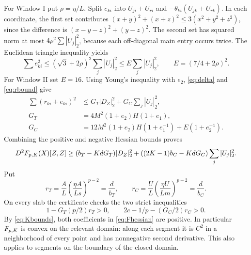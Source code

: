 \documentclass[11pt,a4paper]{article}
\theoremstyle{remark}\newtheorem{remark}[theorem]{Remark}
\begin{document}
For Window I put $\rho=\eta/L$. Split $e_{ki}$ into
$U_{ji}+U_{ri}$ and $-\theta_{ki}(U_{jk}+U_{rk})$.
In each coordinate, the first set contributes $(x+y)^2+(x+z)^2\le
3(x^2+y^2+z^2)$, since the difference is
$(x-y-z)^2+(y-z)^2$. The second set has squared norm at most
$4\rho^2\sum|U_j|_2^2$, because each off-diagonal main entry occurs
twice. The Euclidean triangle inequality yields
\begin{equation}\label{eq:ebound}
\sum e_{ki}^2\le(\sqrt3+2\rho)^2\sum_j|U_j|_2^2
\le E\sum_j|U_j|_2^2,\qquad E=(7/4+2\rho)^2.
\end{equation}
For Window II set $E=16$. Using Young's inequality with $e_2$,
\eqref{eq:delta} and \eqref{eq:rbound} give
\begin{align}
\sum(r_{ki}+e_{ki})^2&\le G_T|D_Z|_2^2+G_C\sum_j|U_j|_2^2,\label{eq:pairbound}\\
G_T&=4M^2(1+e_2)H(1+e_1),\nonumber\\
G_C&=12M^2(1+e_2)H(1+e_1^{-1})+E(1+e_2^{-1}).\nonumber
\end{align}
Combining the positive and negative Hessian bounds proves
\begin{equation}\label{eq:Fhessian}
D^2F_{p,K}(X)[Z,Z]\ge(b_T-KdG_T)|D_Z|_2^2+
((2K-1)b_C-KdG_C)\sum_j|U_j|_2^2.
\end{equation}
Put
\begin{equation}\label{eq:ratios}
r_T=\frac A L\left(\frac{\eta A}{Ls}\right)^{p-2}=\frac d{b_T},\qquad
r_C=\frac U L\left(\frac{\eta U}{Lm}\right)^{p-2}=\frac d{b_C}.
\end{equation}
On every slab the certificate checks the two strict inequalities
\begin{equation}\label{eq:curvature}
1-G_T(p/2)r_T>0,\qquad 2c-1/p-(G_C/2)r_C>0.
\end{equation}
By \eqref{eq:Kbounds}, both coefficients in \eqref{eq:Fhessian} are
positive. In particular $F_{p,K}$ is convex on the relevant domain: along
each segment it is $C^2$ in a neighborhood of every point and has
nonnegative second derivative. This also applies to segments on the
boundary of the closed domain.
\end{document}
